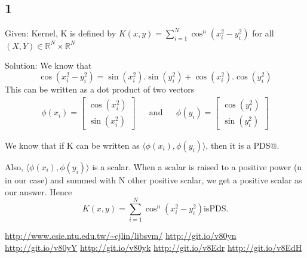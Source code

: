 \documentclass{article}
\begin{document}
\subsection*{1}
\begin{description}
  \item{Given:} Kernel, K is defined by \(K(x,y) = \sum_{i=1}^{N} \cos^{n} (x_{i}^{2} - y_{i}^{2} )\) for all \((X, Y) \in \mathbb{R}^{N} \times \mathbb{R}^{N} \) 
  \item{Solution:}  We know that
    \begin{equation}
      \cos (x_{i}^{2} - y_{i}^{2}) = \sin (x_{i}^{2}).\sin (y_{i}^{2}) + \cos (x_{i}^{2}).\cos (y_{i}^{2})
    \end{equation}
    This can be written as a dot product of two vectors 
    \begin{align}
    \phi(x_{i}) = \begin{bmatrix} \cos (x_{i}^{2}) \\ \sin (x_{i}^{2}) \end{bmatrix} && \mathrm{and} &&
    \phi(y_{i}) = \begin{bmatrix} \cos (y_{i}^{2}) \\ \sin (y_{i}^{2}) \end{bmatrix}
    \end{align}

    We know that if K can be written as \( \langle \phi(x_{i}), \phi(y_{i}) \rangle \), then it is a PDS@.

    Also, \( \langle \phi(x_{i}), \phi(y_{i}) \rangle \) is a scalar.  When a scalar is raised to a positive power (n in our case) and summed with N other positive scalar, we get a positive scalar as our answer.  Hence
    \begin{equation*}
      K(x,y) = \sum_{i=1}^{N} \cos^{n} (x_{i}^{2} - y_{i}^{2} ) \mathrm{is PDS.}
    \end{equation*}
\end{description}

\begin{thebibliography}{1}
   \url{http://www.csie.ntu.edu.tw/~cjlin/libsvm/}
   \url{http://git.io/v80yn}
   \url{http://git.io/v80yY}
   \url{http://git.io/v80yk}
   \url{http://git.io/v8Edr}
   \url{http://git.io/v8EdH}
\end{thebibliography}
\end{document}
